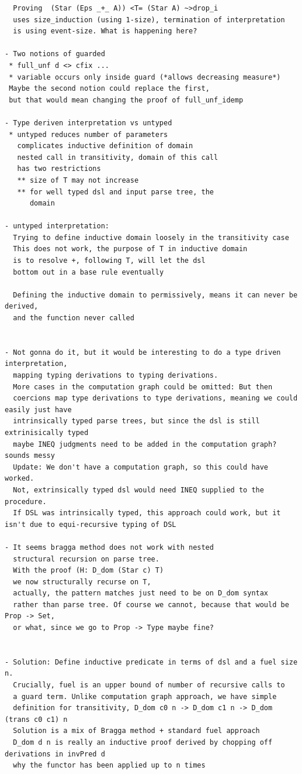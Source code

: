 \begin{verbatim}
  Proving  (Star (Eps _+_ A)) <T= (Star A) ~>drop_i
  uses size_induction (using 1-size), termination of interpretation 
  is using event-size. What is happening here?

- Two notions of guarded
 * full_unf d <> cfix ...
 * variable occurs only inside guard (*allows decreasing measure*)
 Maybe the second notion could replace the first,
 but that would mean changing the proof of full_unf_idemp

- Type deriven interpretation vs untyped
 * untyped reduces number of parameters
   complicates inductive definition of domain
   nested call in transitivity, domain of this call
   has two restrictions
   ** size of T may not increase
   ** for well typed dsl and input parse tree, the
      domain 

- untyped interpretation:
  Trying to define inductive domain loosely in the transitivity case
  This does not work, the purpose of T in inductive domain
  is to resolve +, following T, will let the dsl
  bottom out in a base rule eventually
  
  Defining the inductive domain to permissively, means it can never be derived,
  and the function never called


- Not gonna do it, but it would be interesting to do a type driven interpretation,
  mapping typing derivations to typing derivations.
  More cases in the computation graph could be omitted: But then 
  coercions map type derivations to type derivations, meaning we could easily just have
  intrinsically typed parse trees, but since the dsl is still extrinisically typed 
  maybe INEQ judgments need to be added in the computation graph? sounds messy
  Update: We don't have a computation graph, so this could have worked.
  Not, extrinsically typed dsl would need INEQ supplied to the procedure.
  If DSL was intrinsically typed, this approach could work, but it isn't due to equi-recursive typing of DSL

- It seems bragga method does not work with nested 
  structural recursion on parse tree. 
  With the proof (H: D_dom (Star c) T) 
  we now structurally recurse on T,
  actually, the pattern matches just need to be on D_dom syntax
  rather than parse tree. Of course we cannot, because that would be Prop -> Set,
  or what, since we go to Prop -> Type maybe fine?

  
- Solution: Define inductive predicate in terms of dsl and a fuel size n.
  Crucially, fuel is an upper bound of number of recursive calls to 
  a guard term. Unlike computation graph approach, we have simple
  definition for transitivity, D_dom c0 n -> D_dom c1 n -> D_dom (trans c0 c1) n
  Solution is a mix of Bragga method + standard fuel approach
  D_dom d n is really an inductive proof derived by chopping off derivations in invPred d 
  why the functor has been applied up to n times
  


\end{verbatim}
